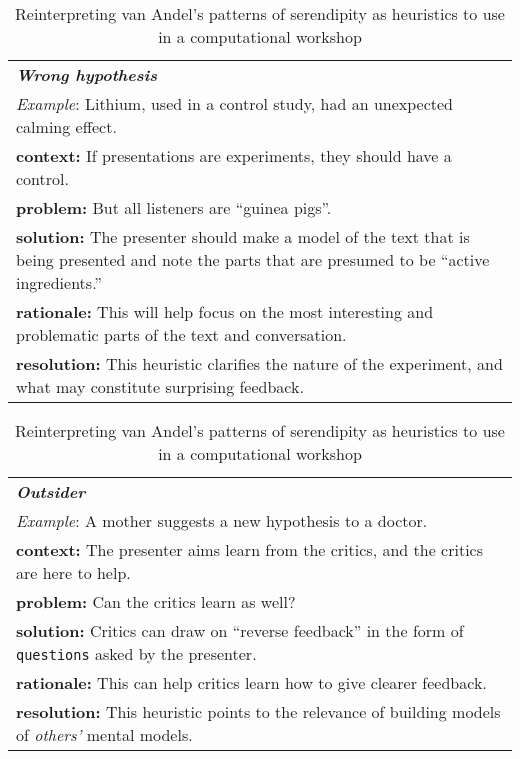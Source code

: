 \begin{table}[p]
\begin{tabular}{p{}}
{\bf\emph{Wrong hypothesis}}  \\[.1cm]
\emph{Example}:  Lithium, used in a control study, had an unexpected calming effect. \\[.1cm]
{\bf context:} If presentations are experiments, they should have a control. \\
{\bf problem:} But all listeners are ``guinea pigs''.\\
{\bf solution:} The presenter should make a model of the text that is being presented and note the parts that are presumed to be ``active ingredients.'' \\
{\bf rationale:} This will help focus on the most interesting and problematic parts of the text and conversation.\\
{\bf resolution:} This heuristic clarifies the nature of the experiment, and what may constitute surprising feedback. \\
\end{tabular}
\medskip

\begin{tabular}{p{}}
{\bf\emph{Outsider}}  \\[.1cm]
\emph{Example}:  A mother suggests a new hypothesis to a doctor. \\[.1cm]
{\bf context:} The presenter aims learn from the critics, and the critics are here to help. \\
{\bf problem:} Can the critics learn as well?\\
{\bf solution:} Critics can draw on ``reverse feedback'' in the form of {\tt questions} asked by the presenter.\\
{\bf rationale:} This can help critics learn how to give clearer feedback.\\
{\bf resolution:} This heuristic points to the relevance of building models of \emph{others'} mental models.\\
\end{tabular}
\vspace{.1cm}
\caption{Reinterpreting van Andel's patterns of serendipity as heuristics to use in a computational workshop\label{tab:reinterpret}}
\end{table}

\bigskip




